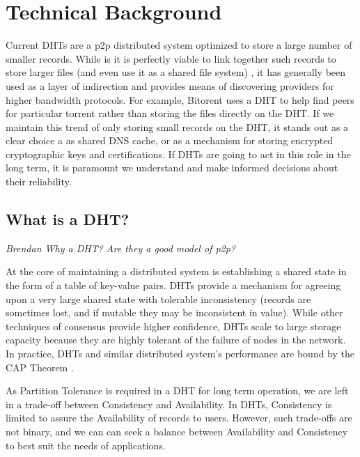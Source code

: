 	
	\section{Technical Background}
	
	Current DHTs are a p2p distributed system optimized to store a large number of smaller records.
	While is it is perfectly viable to link together such records to store larger files (and even use it as a shared file system) \cite{CFS}, it has generally been used as a layer of indirection and provides means of discovering providers for higher bandwidth protocols. 
	For example, Bitorent \cite{bittorrent} uses a DHT to help find peers for particular torrent rather than storing the files directly on the DHT.
	If we maintain this trend of only storing small records on the DHT, it stands out as a clear choice a as shared DNS cache, or as a mechanism for storing encrypted cryptographic keys and certifications.
	If DHTs are going to act in this role in the long term, it is paramount we understand and make informed decisions about their reliability.
	
	\subsection{What is a DHT?}
	\emph{Brendan Why a DHT? Are they a good model of p2p?}
	
	
	
	
	At the core of maintaining a distributed system is establishing a shared state in the form of a table of key-value pairs.
	DHTs provide a mechanism for agreeing upon a very large shared state with tolerable inconsistency (records are sometimes lost, and if mutable they may be inconsistent in value).
	While other techniques of consensus provide higher confidence, DHTs scale to large storage capacity because they are highly tolerant of the failure of nodes in the network.
	In practice, DHTs and similar distributed system's performance are bound by the CAP Theorem \cite{brewer2010certain}.
	
	As Partition Tolerance is required in a DHT for long term operation, we are left in a trade-off between Consistency and Availability.
	In DHTs, Consistency is limited to assure the Availability of records to users. 
	However, such trade-offs are not binary, and we can can seek a balance between Availability and Consistency to best suit the needs of applications.
	
